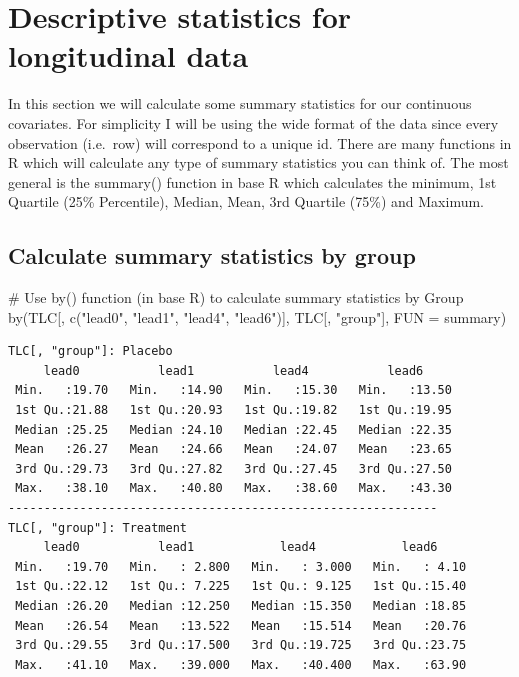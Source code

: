 \documentclass[
  letterpaper,
  DIV=11,
  numbers=noendperiod]{scrreprt}
\newenvironment{Shaded}{\begin{snugshade}}{\end{snugshade}}
\newcommand{\AttributeTok}[1]{\textcolor[rgb]{0.40,0.45,0.13}{#1}}
\newcommand{\CommentTok}[1]{\textcolor[rgb]{0.37,0.37,0.37}{#1}}
\newcommand{\FunctionTok}[1]{\textcolor[rgb]{0.28,0.35,0.67}{#1}}
\newcommand{\NormalTok}[1]{\textcolor[rgb]{0.00,0.23,0.31}{#1}}
\newcommand{\StringTok}[1]{\textcolor[rgb]{0.13,0.47,0.30}{#1}}
\begin{document}
\hypertarget{descriptive-statistics-for-longitudinal-data}{%
\section{Descriptive statistics for longitudinal
data}\label{descriptive-statistics-for-longitudinal-data}}

In this section we will calculate some summary statistics for our
continuous covariates. For simplicity I will be using the wide format of
the data since every observation (i.e.~row) will correspond to a unique
id. There are many functions in R which will calculate any type of
summary statistics you can think of. The most general is the summary()
function in base R which calculates the minimum, 1st Quartile (25\%
Percentile), Median, Mean, 3rd Quartile (75\%) and Maximum.

\hypertarget{calculate-summary-statistics-by-group}{%
\subsection{Calculate summary statistics by
group}\label{calculate-summary-statistics-by-group}}

\begin{Shaded}
\begin{Highlighting}[]
\CommentTok{\# Use by() function (in base R) to calculate summary statistics by Group}
\FunctionTok{by}\NormalTok{(TLC[, }\FunctionTok{c}\NormalTok{(}\StringTok{"lead0"}\NormalTok{, }\StringTok{"lead1"}\NormalTok{, }\StringTok{"lead4"}\NormalTok{, }\StringTok{"lead6"}\NormalTok{)], TLC[, }\StringTok{"group"}\NormalTok{], }\AttributeTok{FUN =}\NormalTok{ summary)}
\end{Highlighting}
\end{Shaded}

\begin{verbatim}
TLC[, "group"]: Placebo
     lead0           lead1           lead4           lead6      
 Min.   :19.70   Min.   :14.90   Min.   :15.30   Min.   :13.50  
 1st Qu.:21.88   1st Qu.:20.93   1st Qu.:19.82   1st Qu.:19.95  
 Median :25.25   Median :24.10   Median :22.45   Median :22.35  
 Mean   :26.27   Mean   :24.66   Mean   :24.07   Mean   :23.65  
 3rd Qu.:29.73   3rd Qu.:27.82   3rd Qu.:27.45   3rd Qu.:27.50  
 Max.   :38.10   Max.   :40.80   Max.   :38.60   Max.   :43.30  
------------------------------------------------------------ 
TLC[, "group"]: Treatment
     lead0           lead1            lead4            lead6      
 Min.   :19.70   Min.   : 2.800   Min.   : 3.000   Min.   : 4.10  
 1st Qu.:22.12   1st Qu.: 7.225   1st Qu.: 9.125   1st Qu.:15.40  
 Median :26.20   Median :12.250   Median :15.350   Median :18.85  
 Mean   :26.54   Mean   :13.522   Mean   :15.514   Mean   :20.76  
 3rd Qu.:29.55   3rd Qu.:17.500   3rd Qu.:19.725   3rd Qu.:23.75  
 Max.   :41.10   Max.   :39.000   Max.   :40.400   Max.   :63.90  
\end{verbatim}
\end{document}
